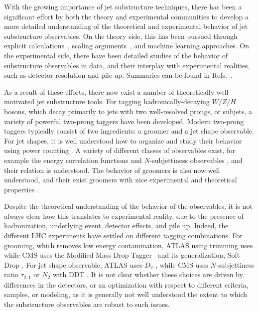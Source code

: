 \documentclass[11pt,letterpaper]{article}
\DeclareRobustCommand{\Refs}[1]{Refs.~\cite{#1}}
\begin{document}
With the growing importance of jet substructure techniques, there has been a significant effort by both the theory and experimental communities to develop a more detailed understanding of the theoretical and experimental behavior of jet substructure observables.
%
On the theory side, this has been pursued through explicit calculations~\cite{Feige:2012vc,Field:2012rw,Dasgupta:2013ihk,Dasgupta:2013via,Larkoski:2014pca,Dasgupta:2015yua,Seymour:1997kj,Li:2011hy,Larkoski:2012eh,Jankowiak:2012na,Chien:2014nsa,Chien:2014zna,Isaacson:2015fra,Krohn:2012fg,Waalewijn:2012sv,Larkoski:2014tva,Procura:2014cba,Bertolini:2015pka,Bhattacherjee:2015psa,Larkoski:2015kga,Dasgupta:2015lxh,Frye:2016okc,Frye:2016aiz,Kang:2016ehg,Hornig:2016ahz,Marzani:2017mva}, scaling arguments~\cite{Walsh:2011fz,Larkoski:2014gra,Larkoski:2014zma}, and machine learning \cite{Cogan:2014oua,deOliveira:2015xxd,Almeida:2015jua,Baldi:2016fql,Guest:2016iqz,Conway:2016caq,Barnard:2016qma} approaches.
%
On the experimental side, there have been detailed studies of the behavior of substructure observables in data, and their interplay with experimental realities, such as detector resolution and pile up.
%
Summaries can be found in \Refs{Abdesselam:2010pt,Altheimer:2012mn,Altheimer:2013yza,Adams:2015hiv}.

As a result of these efforts, there now exist a number of theoretically well-motivated jet substructure tools.
%
For tagging hadronically-decaying $W/Z/H$ bosons, which decay primarily to jets with two well-resolved prongs, or subjets, a variety of powerful two-prong taggers have been developed.
%
Modern two-prong taggers typically consist of two ingredients: a groomer and a jet shape observable.
%
For jet shapes, it is well understood how to organize and study their
behavior using power counting \cite{Larkoski:2014gra}.
%
A variety of
different classes of observables exist, for example the energy
correlation functions \cite{Larkoski:2013eya} and $N$-subjettiness
observables \cite{Thaler:2010tr,Thaler:2011gf}, and their relation is
understood.
%
The behavior of groomers is also now well understood, and
their exist groomers with nice experimental and theoretical properties
\cite{Dasgupta:2013ihk,Larkoski:2014wba}.

Despite the
theoretical understanding of the behavior of the observables, it is
not always clear how this translates to experimental reality, due to
the presence of hadronization, underlying event, detector effects, and
pile up.
%
Indeed, the different LHC experiments have settled on different
tagging combinations.
%
For grooming, which removes low energy
contamination,  ATLAS using trimming \cite{Krohn:2009th} uses while CMS uses the Modified
  Mass Drop Tagger~\cite{Dasgupta:2013ihk} and its generalization, Soft Drop \cite{Larkoski:2014wba}.
  For jet shape observable, ATLAS uses $D_2$ \cite{Larkoski:2014gra,Larkoski:2015kga}, while CMS uses $N$-subjettiness ratio $\tau_{2,1}$ \cite{Thaler:2010tr,Thaler:2011gf} or $N_2$ \cite{Moult:2016cvt} with DDT \cite{Dolen:2016kst}.
  It is not clear whether these choices are driven by differences in the detectors, or an optimization with respect to different criteria, samples, or modeling, as it is generally not well understood the extent to which the substructure observables are robust to such issues.
\end{document}
